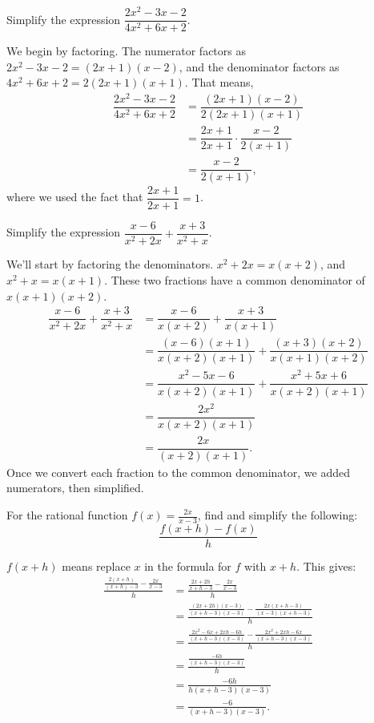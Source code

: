 \documentclass{ximera}
\begin{document}
\begin{example}
	Simplify the expression $\displaystyle \dfrac{2x^2-3x-2}{4x^2+6x+2}$.
	\begin{explanation}
		We begin by factoring.  The numerator factors as $2x^2 - 3x -2 = (2x+1)(x-2)$, and the denominator factors as $4x^2+6x+2 = 2(2x+1)(x+1)$.
		That means,
		\begin{align*}
			\dfrac{2x^2-3x-2}{4x^2 + 6x + 2} &= \dfrac{(2x+1)(x-2)}{2(2x+1)(x+1)} \\
				&= \dfrac{2x+1}{2x+1} \cdot \dfrac{x-2}{2(x+1)}\\
				&= \dfrac{x-2}{2(x+1)},
		\end{align*}	
		where we used the fact that $\displaystyle \dfrac{2x+1}{2x+1} = 1$.
	\end{explanation}
\end{example}

\begin{example}
	Simplify the expression $\displaystyle \dfrac{x-6}{x^2+2x} + \dfrac{x+3}{x^2+x}$.
	\begin{explanation}
		We'll start by factoring the denominators.  $x^2+2x = x(x+2)$, and $x^2+x = x(x+1)$.
		These two fractions have a common denominator of $x(x+1)(x+2)$.
		\begin{align*}
			\dfrac{x-6}{x^2+2x} + \dfrac{x+3}{x^2+x} &= \dfrac{x-6}{x(x+2)} + \dfrac{x+3}{x(x+1)}\\
				&= \dfrac{(x-6)(x+1)}{x(x+2)(x+1)} + \dfrac{(x+3)(x+2)}{x(x+1)(x+2)}\\
				&= \dfrac{x^2-5x-6}{x(x+2)(x+1)} + \dfrac{x^2+5x+6}{x(x+2)(x+1)}\\ 
				&= \dfrac{2x^2}{x(x+2)(x+1)}\\
				&= \dfrac{2x}{(x+2)(x+1)}.
		\end{align*}
		Once we convert each fraction to the common denominator, we added numerators, then simplified.
	\end{explanation}
\end{example}

\begin{example}
	For the rational function $\displaystyle f(x) = \frac{2x}{x-3}$, find and simplify the following:
		\[ \frac{f(x+h)-f(x)}{h} \]
	\begin{explanation}
		$\displaystyle f(x+h)$ means replace $x$ in the formula for $f$ with $x+h$.  This gives:
		\begin{align*}
			\frac{\frac{2(x+h)}{(x+h)-3} - \frac{2x}{x-3} }{h} &= \frac{ \frac{2x+2h}{x+h-3} - \frac{2x}{x-3}}{h} \\
				&= \frac{ \frac{ (2x+2h)(x-3) }{(x+h-3)(x-3)} - \frac{2x(x+h-3)}{(x-3)(x+h-3)} }{h}\\
				&= \frac{ \frac{2x^2-6x+2xh-6h}{(x+h-3)(x-3)} - \frac{2x^2+2xh-6x}{(x+h-3)(x-3)}  }{h}\\
				&= \frac{  \frac{-6h}{(x+h-3)(x-3)}     }{h} \\
				&= \frac{-6h}{h(x+h-3)(x-3)} \\
				&= \frac{-6}{(x+h-3)(x-3)}.
		\end{align*}
	\end{explanation}
\end{example}
\end{document}
